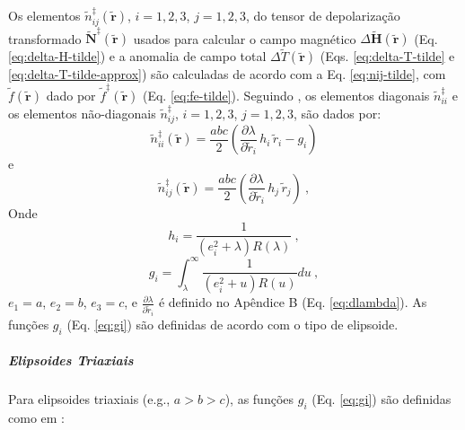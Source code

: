 Os elementos $\tilde{n}^{\ddagger}_{ij}(\tilde{\mathbf{r}})$,
$i = 1, 2, 3$, $j = 1, 2, 3$, do tensor de depolarização transformado 
$\tilde{\mathbf{N}}^{\ddagger}(\tilde{\mathbf{r}})$ usados para calcular
o campo magnético $\Delta \tilde{\mathbf{H}}(\tilde{\mathbf{r}})$ 
(Eq. \ref{eq:delta-H-tilde}) e
a anomalia de campo total $\Delta \tilde{T}(\tilde{\mathbf{r}})$
(Eqs. \ref{eq:delta-T-tilde} e \ref{eq:delta-T-tilde-approx}) 
são calculadas de acordo com a Eq. \ref{eq:nij-tilde}, com 
$\tilde{f}(\tilde{\mathbf{r}})$ dado por $\tilde{f}^{\ddagger}(\tilde{\mathbf{r}})$
(Eq. \ref{eq:fe-tilde}).
Seguindo \citet{clark1986}, os elementos diagonais $\tilde{n}^{\ddagger}_{ii}$
e os elementos não-diagonais $\tilde{n}^{\ddagger}_{ij}$, $i = 1, 2, 3$,
$j = 1, 2, 3$, são dados por:
\begin{equation}
\tilde{n}^{\ddagger}_{ii}(\tilde{\mathbf{r}}) =
\frac{abc}{2}
\left( \frac{\partial \lambda}{\partial \tilde{r}_{i}} \, h_{i} \, \tilde{r}_{i}
- g_{i} \right)
\label{eq:n-tilde-ddagger-ii}
\end{equation}
e
\begin{equation}
\tilde{n}^{\ddagger}_{ij}(\tilde{\mathbf{r}}) =
\frac{abc}{2} \left(
\frac{\partial \lambda}{\partial \tilde{r}_{i}} \, h_{j} \, \tilde{r}_{j} 
\right) \: ,
\label{eq:n-tilde-dagger-ij}
\end{equation}
Onde
\begin{equation}
h_{i} = \frac{1}{\left( e_{i}^{2} + \lambda \right) R(\lambda)} \: ,
\label{eq:hi}
\end{equation}
\begin{equation}
g_{i} = \int_{\lambda}^{\infty} \frac{1}{\left( e_{i}^{2} + u \right) R(u)} du \: ,
\label{eq:gi}
\end{equation}
$e_{1} = a$, $e_{2} = b$, $e_{3} = c$, e 
$\frac{\partial \lambda}{\partial \tilde{r}_{i}}$
é definido no Apêndice B (Eq. \ref{eq:dlambda}).
As funções $g_{i}$ (Eq. \ref{eq:gi}) são definidas de acordo com
o tipo de elipsoide.

\subparagraph*{Elipsoides Triaxiais}

Para elipsoides triaxiais  (e.g., $a > b > c$), as funções
$g_{i}$ (Eq. \ref{eq:gi}) são definidas como em
\citep{clark1986}:


